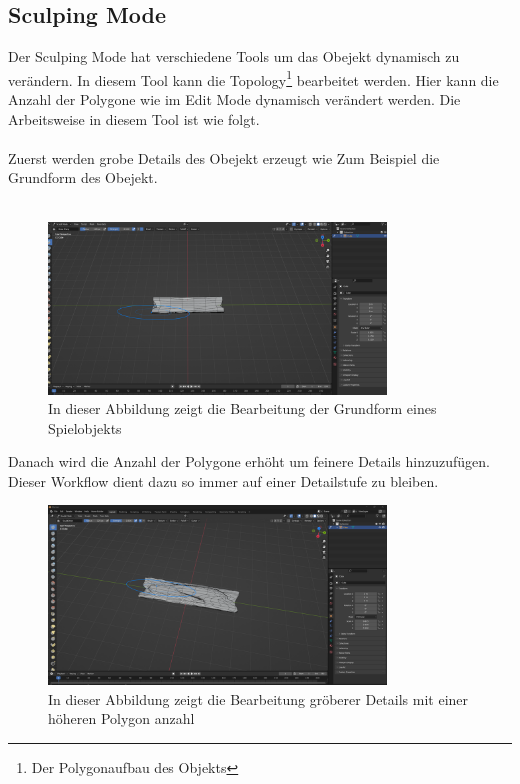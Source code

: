 \subsection{Sculping Mode}
Der Sculping Mode hat verschiedene Tools um das Obejekt dynamisch zu verändern. In diesem Tool kann die Topology\footnote[1]{Der Polygonaufbau des Objekts} bearbeitet werden. Hier kann die Anzahl der Polygone wie im Edit Mode dynamisch verändert werden. Die Arbeitsweise in diesem Tool ist wie folgt.\\\\
Zuerst werden grobe Details des Obejekt erzeugt wie Zum Beispiel die Grundform des Obejekt.\\\\
\begin{figure}[H]
    \centering
    \includegraphics[width=0.8\textwidth]{chapters/13/images/HolzBrett.png}
    \caption{In dieser Abbildung zeigt die Bearbeitung der Grundform eines Spielobjekts}
    \label{UST-14}
\end{figure}
\noindent Danach wird die Anzahl der Polygone erhöht um feinere Details hinzuzufügen. Dieser Workflow dient dazu so immer auf einer Detailstufe zu bleiben.
\begin{figure}[H]
    \centering
    \includegraphics[width=0.8\textwidth]{chapters/13/images/HolzBrett1.png}
    \caption{In dieser Abbildung zeigt die Bearbeitung gröberer Details mit einer höheren Polygon anzahl}
    \label{UST-15}
\end{figure}
